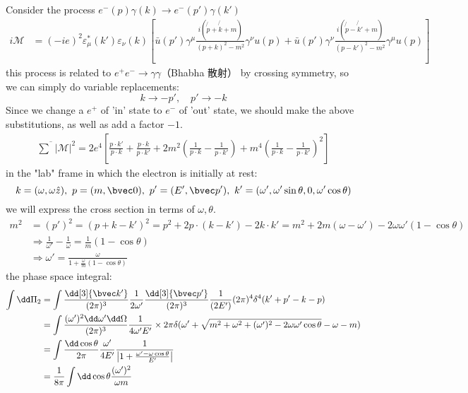 

Consider the process $e^-(p)\gamma(k)\rightarrow e^-(p')\gamma(k')$
\begin{equation}\begin{aligned}
i\mathcal{M} &= (-ie)^2 \varepsilon_\mu^*(k')\varepsilon_\nu(k) \left[\bar u(p')\gamma^\mu \frac{i(\not{p}+\not{k}+m)}{(p+k)^2-m^2} \gamma^\nu u(p)+ 
\bar u(p')\gamma^\nu \frac{i(\not{p}-\not{k}'+m)}{(p-k')^2-m^2} \gamma^\mu u(p)
\right]
\end{aligned}\end{equation}
this process is related to  $e^+e^-\rightarrow \gamma\gamma$（Bhabha 散射） by crossing symmetry, so we can simply do variable replacements:
\[
k\rightarrow -p',\quad p'\rightarrow -k
\]
Since we change a $e^+$ of 'in' state to $e^-$ of 'out' state, we should make the above substitutions, as well as add a factor $-1$.
\begin{equation}\begin{aligned}
\overline{\sum}|\mathcal{M}|^2
=2e^4\left[\frac{p\cdot k'}{p\cdot k}+\frac{p\cdot k}{p\cdot k'}+2m^2\left(\frac{1}{p\cdot k}-\frac{1}{p\cdot k'}\right)+m^4\left(\frac{1}{p\cdot k}-\frac{1}{p\cdot k'}\right)^2\right]
\end{aligned}\end{equation}
in the "lab" frame in which the electron is initially at rest:
\[
k=(\omega,\omega \hat z), \ p=(m,\bvec 0),\ p'=(E',\bvec p'),\ k'=(\omega',\omega'\sin\theta,0,\omega'\cos\theta)
\]
we will express the cross section in terms of $\omega,\theta$.
\begin{equation}\begin{aligned}
m^2&=(p')^2=(p+k-k')^2=p^2+2p\cdot(k-k')-2k\cdot k'=m^2+2m(\omega-\omega')-2\omega\omega'(1-\cos\theta)\\
&\Rightarrow 
\frac{1}{\omega'}-\frac{1}{\omega}=\frac{1}{m}(1-\cos\theta)\\
&\Rightarrow \omega'=\frac{\omega}{1+\frac{\omega}{m}(1-\cos\theta)}
\end{aligned}\end{equation}
the phase space integral:
\begin{equation}\begin{aligned}
\int \dd \Pi_2 &= \int \frac{\dd[3]{\bvec k'}}{(2\pi)^3} \frac{1}{2\omega'} \frac{\dd[3]{\bvec p'}}{(2\pi)^3}\frac{1}{(2 E')}(2\pi)^4 \delta^4(k'+p'-k-p)\\
&=\int \frac{(\omega')^2\dd \omega' \dd \Omega}{(2\pi)^3} \frac{1}{4\omega'E'}\times 2\pi \delta(\omega'+\sqrt{m^2+\omega^2+(\omega')^2-2\omega\omega'\cos\theta}-\omega-m)\\
&=\int \frac{\dd \cos\theta}{2\pi}\frac{\omega'}{4E'}\frac{1}{\left|1+\frac{\omega'-\omega\cos\theta}{E'}\right|}\\
&=\frac{1}{8\pi}\int \dd \cos\theta\frac{(\omega')^2}{\omega m}
\end{aligned}\end{equation}
